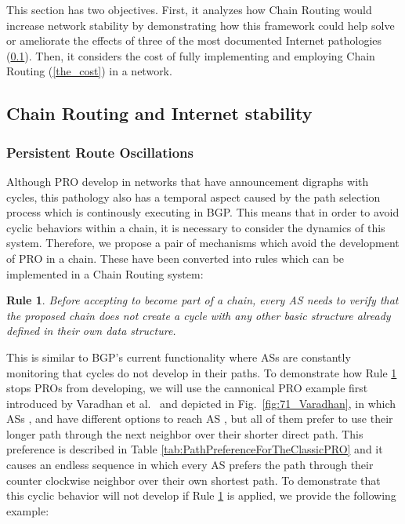 \documentclass[5p,twocolumn]{elsarticle}
\newtheorem{Rule}{Rule}
\begin{document}
This section has two objectives. First, it analyzes how Chain Routing would increase network stability by demonstrating how this framework could help solve or ameliorate the effects of three of the most documented Internet pathologies (\ref{internet_stability}). Then, it considers the cost of fully implementing and employing Chain Routing (\ref{the_cost}) in a network.


\subsection{Chain Routing and Internet stability}\label{internet_stability}


\subsubsection{Persistent Route Oscillations}\label{is_pro}

Although PRO \cite{Varadhan1996} develop in networks that have announcement digraphs with cycles, this pathology also has a temporal aspect caused by the path selection process which is continously executing in BGP. This means that in order to avoid cyclic behaviors within a chain, it is necessary to consider the dynamics of this system. Therefore, we propose a pair of mechanisms which avoid the development of PRO in a chain. These have been converted into rules which can be implemented in a Chain Routing system:

\begin{Rule}\label{R:David01}
Before accepting to become part of a chain, every AS needs to verify that the proposed chain does not create a cycle with any other basic structure already defined in their own data structure.
\end{Rule}

This is similar to BGP's current functionality where ASs are constantly monitoring that cycles do not develop in their paths. To demonstrate how Rule \ref{R:David01} stops PROs from developing, we will use the cannonical PRO example first introduced by Varadhan et al.\ \cite{Varadhan1996} and depicted in Fig.\ \ref{fig:71_Varadhan}, in which ASs ,  and  have different options to reach AS , but all of them prefer to use their longer path through the next neighbor over their shorter direct path. This preference is described in Table \ref{tab:PathPreferenceForTheClassicPRO} and it causes an endless sequence in which every AS prefers the path through their counter clockwise neighbor over their own shortest path. To demonstrate that this cyclic behavior will not develop if Rule \ref{R:David01} is applied, we provide the following example:
\end{document}
